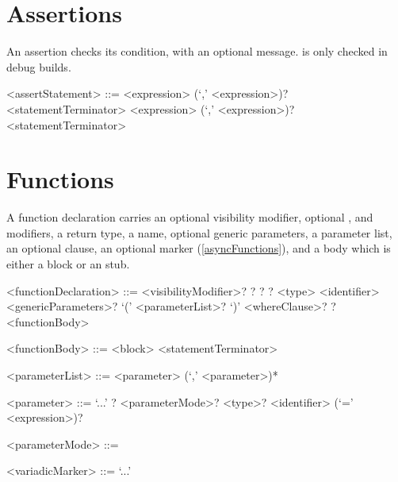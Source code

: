\documentclass[makeidx]{article}
\begin{document}
\section{Assertions}

\LMHash{}%
An assertion checks its condition, with an optional message.
 is only checked in debug builds.

\begin{grammar}
<assertStatement> ::= \ASSERT{} <expression> (`,' <expression>)?
  \gnewline{} <statementTerminator>
  \alt \DEBUGASSERT{} <expression> (`,' <expression>)?
  \gnewline{} <statementTerminator>
\end{grammar}

\section{Functions}

\LMHash{}%
A function declaration carries an optional visibility modifier,
optional ,  and  modifiers,
a return type, a name, optional generic parameters, a parameter list,
an optional  clause, an optional  marker
(\ref{asyncFunctions}), and a body which is either a block
or an  stub.

\begin{grammar}
<functionDeclaration> ::= <visibilityModifier>? \STATIC{}? \SEALED{}?
  \gnewline{} \OVERRIDE{}? <type> <identifier> <genericParameters>?
  \gnewline{} `(' <parameterList>? `)' <whereClause>? \ASYNC{}? <functionBody>

<functionBody> ::= <block>
  \alt \INITIALIZE{} <statementTerminator>

<parameterList> ::= <parameter> (`,' <parameter>)*

<parameter> ::= `...' ? <parameterMode>? <type>? <identifier>
  \gnewline{} (`=' <expression>)?

<parameterMode> ::= \REF{}
  \alt \OUT{}

<variadicMarker> ::= `...'
\end{grammar}

\end{document}
